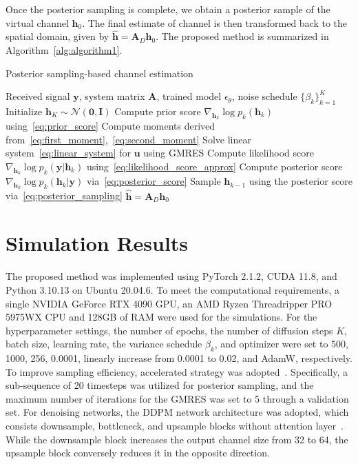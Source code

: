 \documentclass[lettersize,journal]{IEEEtran}
\begin{document}
Once the posterior sampling is complete, we obtain a posterior sample of the virtual channel $\mathbf{h}_{0}$. The final estimate of channel is then transformed back to the spatial domain, given by $\hat{\mathbf{h}} = \mathbf{A}_{D}\mathbf{h}_{0}$. The proposed method is summarized in Algorithm~\ref{alg:algorithm1}.

\begin{algorithm}[!t]
\caption{Posterior sampling-based channel estimation}
\label{alg:algorithm1}
\begin{algorithmic}[1]
\REQUIRE Received signal $\mathbf{y}$, system matrix $\mathbf{A}$, trained model $\epsilon_{\theta}$, noise schedule $\{\beta_{k}\}_{k=1}^{K}$
\STATE Initialize $\mathbf{h}_K \sim \mathcal{N}(\mathbf{0}, \mathbf{I})$
	\STATE Compute prior score $\nabla_{\mathbf{h}_{k}}\log p_{k}(\mathbf{h}_{k})$ using~\eqref{eq:prior_score}
	\STATE Compute moments derived from~\eqref{eq:first_moment},~\eqref{eq:second_moment}
	\STATE Solve linear system~\eqref{eq:linear_system} for $\mathbf{u}$ using GMRES
	\STATE Compute likelihood score $\nabla_{\mathbf{h}_{k}}\log p_{k}(\mathbf{y}|\mathbf{h}_{k})$ using~\eqref{eq:likelihood_score_approx}
	\STATE Compute posterior score $\nabla_{\mathbf{h}_{k}}\log p_{k}(\mathbf{h}_{k}|\mathbf{y})$ via~\eqref{eq:posterior_score}
	\STATE Sample $\mathbf{h}_{k-1}$ using the posterior score via~\eqref{eq:posterior_sampling}
\ENDFOR
\RETURN $\hat{\mathbf{h}} = \mathbf{A}_{D}\mathbf{h}_{0}$
\end{algorithmic}
\end{algorithm}

\section{Simulation Results}

The proposed method was implemented using PyTorch 2.1.2, CUDA 11.8, and Python 3.10.13 on Ubuntu 20.04.6. To meet the computational requirements, a single NVIDIA GeForce RTX 4090 GPU, an AMD Ryzen Threadripper PRO 5975WX CPU and 128GB of RAM were used for the simulations. For the hyperparameter settings, the number of epochs, the number of diffusion steps $K$, batch size, learning rate, the variance schedule $\beta_{k}$, and optimizer were set to 500, 1000, 256, 0.0001, linearly increase from 0.0001 to 0.02, and AdamW, respectively.
To improve sampling efficiency, accelerated strategy was adopted~\cite{songDenoisingDiffusionImplicit2020}. Specifically, a sub-sequence of 20 timesteps was utilized for posterior sampling, and the maximum number of iterations for the GMRES was set to 5 through a validation set. For denoising networks, the DDPM network architecture was adopted, which consists downsample, bottleneck, and upsample blocks without attention layer~\cite{hoDenoisingDiffusionProbabilistic2020}. While the downsample block increases the output channel size from 32 to 64, the upsample block conversely reduces it in the opposite direction.
\end{document}
